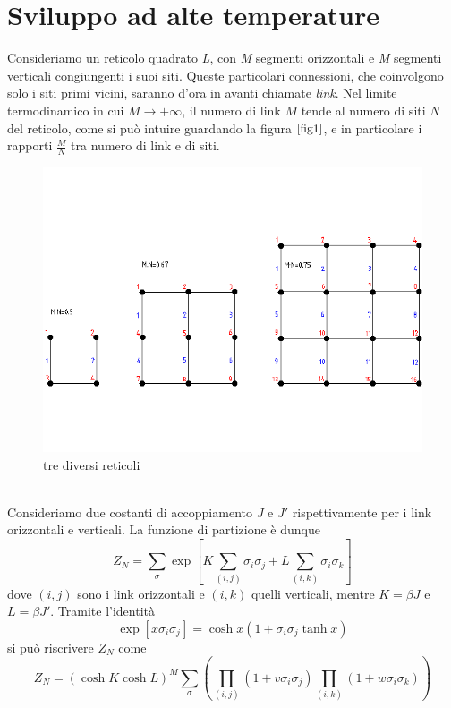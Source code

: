 \documentclass[11pt]{article}
\title{}
\author{}
\date{}
\begin{document}
\maketitle

\section{Sviluppo ad alte temperature}

Consideriamo un reticolo quadrato \emph{L}, con \emph{M} segmenti orizzontali e \emph{M} segmenti verticali congiungenti i suoi siti. Queste particolari connessioni, che coinvolgono solo i siti primi vicini, saranno d'ora in avanti chiamate \emph{link}. Nel limite termodinamico in cui $M\to+\infty$, il numero di link $M$ tende al numero di siti $N$ del reticolo, come si può intuire guardando la figura $ \ref{fig1} $, e in particolare i rapporti $\frac{M}{N}$ tra numero di link e di siti.
\begin{figure}[h]
\centering
\includegraphics[width=0.72\columnwidth]{sat1}
\caption{tre diversi reticoli}
\label{fig1}
\end{figure}
\\Consideriamo due costanti di accoppiamento $J$ e $J'$ rispettivamente per i link orizzontali e verticali. La funzione di partizione è dunque
\begin{equation} \label{z}
Z_N=\sum_\sigma \exp[K\sum_{(i,j)}\sigma_i\sigma_j+L\sum_{(i,k)}\sigma_i\sigma_k]
\end{equation}
dove $(i,j)$ sono i link orizzontali e $(i,k)$ quelli verticali, mentre $K=\beta J$ e $L=\beta J'$.
Tramite l'identità
$$\exp[x\sigma_i\sigma_j]=\cosh{x}(1+\sigma_i\sigma_j\tanh{x})$$
si può riscrivere $Z_N$ come
\begin{equation}\label{z2}
Z_N=(\cosh{K}\cosh{L})^M\sum_{\sigma}\left(\prod_{(i,j)}(1+v\sigma_i\sigma_j)\prod_{(i,k)}(1+w\sigma_i\sigma_k)\right) 
\end{equation}
\end{document}
